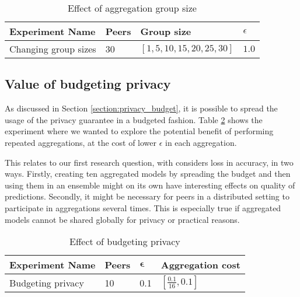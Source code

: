 \begin{table}[h]
	\centering
	\begin{tabular}{|l|l|l|l|}
		{\bf Experiment Name} & {\bf Peers} & {\bf Group size} & $\epsilon$ \\
		\hline
		Changing group sizes  & 30          & $[1, 5, 10, 15, 20, 25, 30]$      &     $1.0$     \\ 
	\end{tabular}
	\caption{Effect of aggregation group size}
	\label{tab:experiments_group_sizes}
\end{table}
 

\subsection{Value of budgeting privacy}
 
As discussed in Section \ref{section:privacy_budget}, it is possible to spread the usage of the privacy guarantee in a budgeted fashion. Table \ref{tab:experiments_budgeting_privacy} shows the experiment where we wanted to explore the potential benefit of performing repeated aggregations, at the cost of lower $\epsilon$ in each aggregation. 

This relates to our first research question, with considers loss in accuracy, in two ways. Firstly, creating ten aggregated models by spreading the budget and then using them in an ensemble might on its own have interesting effects on quality of predictions. Secondly, it might be necessary for peers in a distributed setting to participate in aggregations several times. This is especially true if aggregated models cannot be shared globally for privacy or practical reasons.

\begin{table}[h]
	\centering	
	\begin{tabular}{|l|l|l|l|}
		{\bf Experiment Name} & {\bf Peers} & $\boldsymbol{\epsilon}$ & {\bf Aggregation cost}        \\
		\hline
		Budgeting privacy & 10    & 0.1     & $[\frac{0.1}{16}, 0.1]$
	\end{tabular}
	\caption{Effect of budgeting privacy}
	\label{tab:experiments_budgeting_privacy}
\end{table}
